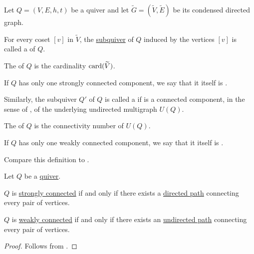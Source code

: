 \begin{definition}\label{def:quiver_connectedness}
  Let \( Q = (V, E, h, t) \) be a quiver and let \( \widetilde{G} = (\widetilde{V}, \widetilde{E}) \) be its condensed directed graph.

  \begin{thmenum}
     For every coset \( [v] \) in \( \widetilde{V} \), the \hyperref[def:hypergraph/submodels]{subquiver} of \( Q \) induced by the vertices \( [v] \) is called a  of \( Q \).

    The  of \( Q \) is the cardinality \( \operatorname{card}(\widetilde{V}) \).

    If \( Q \) has only one strongly connected component, we say that it itself is .

     Similarly, the subquiver \( Q' \) of \( Q \) is called a  if is a connected component, in the sense of , of the underlying undirected multigraph \( U(Q) \).

    The  of \( Q \) is the connectivity number of \( U(Q) \).

    If \( Q \) has only one weakly connected component, we say that it itself is .
  \end{thmenum}

  Compare this definition to .
\end{definition}

\begin{proposition}\label{thm:quiver_connectedness_via_chains}
  Let \( Q \) be a \hyperref[def:quiver]{quiver}.

  \begin{thmenum}
     \( Q \) is \hyperref[def:quiver_connectedness/strong]{strongly connected} if and only if there exists a \hyperref[def:quiver_path]{directed path} connecting every pair of vertices.

     \( Q \) is \hyperref[def:quiver_connectedness/weak]{weakly connected} if and only if there exists an \hyperref[def:undirected_multigraph_path]{undirected path} connecting every pair of vertices.
  \end{thmenum}
\end{proposition}
\begin{proof}
  Follows from .
\end{proof}

